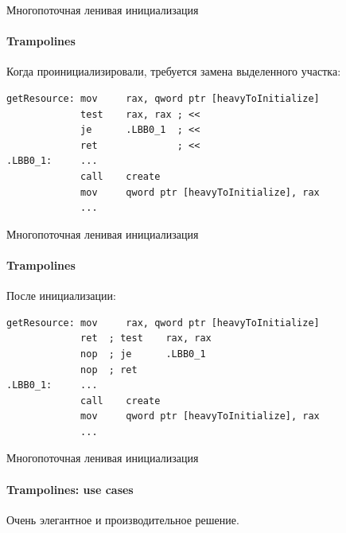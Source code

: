 \begin{frame}{Многопоточная ленивая инициализация}
\framesubtitle{Trampolines}

Когда проинициализировали, требуется замена выделенного участка:
\begin{verbatim}
getResource: mov     rax, qword ptr [heavyToInitialize]
             test    rax, rax ; <<    
             je      .LBB0_1  ; <<    
             ret              ; <<    
.LBB0_1:     ...
             call    create
             mov     qword ptr [heavyToInitialize], rax
             ...
\end{verbatim}
\end{frame}

\begin{frame}{Многопоточная ленивая инициализация}
\framesubtitle{Trampolines}

После инициализации:
\begin{verbatim}
getResource: mov     rax, qword ptr [heavyToInitialize]
             ret  ; test    rax, rax
             nop  ; je      .LBB0_1
             nop  ; ret
.LBB0_1:     ...
             call    create
             mov     qword ptr [heavyToInitialize], rax
             ...
\end{verbatim}
\end{frame}


\begin{frame}[t]{Многопоточная ленивая инициализация}
\framesubtitle{Trampolines: use cases}

Очень элегантное и производительное решение. 

\pause


\end{frame}


